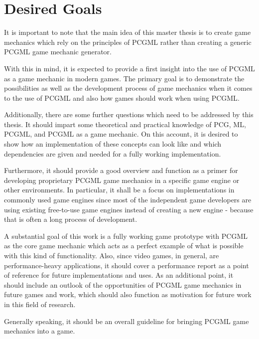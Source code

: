 \documentclass[MGS,Master,english]{twbook}%
\begin{document}
\section{Desired Goals}
It is important to note that the main idea of this master thesis is to create game mechanics which rely on the principles of PCGML rather than creating a generic PCGML game mechanic generator.

With this in mind, it is expected to provide a first insight into the use of \ac{PCGML} as a game mechanic in modern games. The primary goal is to demonstrate the possibilities as well as the development process of game mechanics when it comes to the use of \ac{PCGML} and also how games should work when using \ac{PCGML}.

Additionally, there are some further questions which need to be addressed by this thesis. It should impart some theoretical and practical knowledge of PCG, ML, \ac{PCGML}, and \ac{PCGML} as a game mechanic. On this account, it is desired to show how an implementation of these concepts can look like and which dependencies are given and needed for a fully working implementation. 

Furthermore, it should provide a good overview and function as a primer for developing proprietary \ac{PCGML} game mechanics in a specific game engine or other environments. In particular, it shall be a focus on implementations in commonly used game engines since most of the independent game developers are using existing free-to-use game engines instead of creating a new engine - because that is often a long process of development. 

A substantial goal of this work is a fully working game prototype with \ac{PCGML} as the core game mechanic which acts as a perfect example of what is possible with this kind of functionality. Also, since video games, in general, are performance-heavy applications, it should cover a performance report as a point of reference for future implementations and uses. As an additional point, it should include an outlook of the opportunities of \ac{PCGML} game mechanics in future games and work, which should also function as motivation for future work in this field of research.

Generally speaking, it should be an overall guideline for bringing \ac{PCGML} game mechanics into a game.
\end{document}
